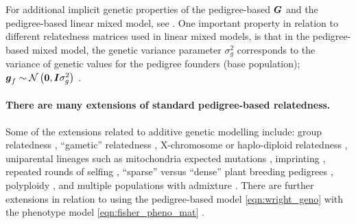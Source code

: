 %
For additional implicit genetic properties of the pedigree-based
$\boldsymbol{G}$ and the pedigree-based linear mixed model, see
\cite{kennedy1988genetic}.
%
One important property in relation to different relatedness matrices used
in linear mixed models, is that in the pedigree-based mixed model, the
genetic variance parameter $\sigma_g^2$ corresponds to the variance of
genetic values for the pedigree founders (base population);
$\boldsymbol{g}_f \sim \mathcal{N}\left(\boldsymbol{0}, \boldsymbol{I}\sigma_g^2\right)$
\citep{kennedy1988genetic, powell2010reconciling, legarra2016comparing}.

\paragraph{There are many extensions of standard pedigree-based relatedness.}
%
Some of the extensions related to additive genetic modelling include:
%
group relatedness \citep{wright1949genetical, jacquard1975inbreeding, cockerham1976group},
%
``gametic'' relatedness \citep{smith1985efficient, schaeffer1989inverse},
%
X-chromosome or haplo-diploid relatedness \citep{grossman1989inbreeding, fernando1990genetic},
%
uniparental lineages such as mitochondria \citep[e.g.][]{gibson1997cytoplasmic}
%
expected mutations \citep{wray1990accounting, casellas2008within},
%
%
imprinting \citep{schaeffer1989inverse, tier1993analysing},
%
%
repeated rounds of selfing \citep{sneller1994sas, oakey2006joint},
%
``sparse'' versus ``dense'' plant breeding pedigrees \citep{kim2016numericware},
%
polyploidy \citep{kerr2012use, hamilton2018computation}, and
%
multiple populations with admixture \citep{vanraden1992accounting, garciacortes2006multibreed}.
%
There are further extensions in relation to using the pedigree-based model
\eqref{eqn:wright_geno} with the phenotype model \eqref{eqn:fisher_pheno_mat}
\citep{henderson1984applications, mrode2023linear}.

